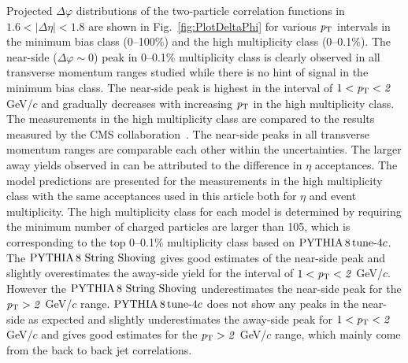 Projected $\Delta\varphi$ distributions of the two-particle correlation functions in $1.6<|\Delta\eta|<1.8$ are shown in Fig.~\ref{fig:PlotDeltaPhi} for various $\it{p}_{\rm{T}}$ intervals in the minimum bias class (0--100\%) and the high multiplicity class (0--0.1\%). The near-side ($\Delta\varphi\sim 0$) peak in 0--0.1\% multiplicity class is clearly observed in all transverse momentum ranges studied while there is no hint of signal in the minimum bias class. The near-side peak is highest in the interval of $1<\it{p}_{\rm{T}}<2$ GeV/$c$ and gradually decreases with increasing $\it{p}_{\rm{T}}$ in the high multiplicity class. The measurements in the high multiplicity class are compared to the results measured by the CMS collaboration~\cite{Khachatryan:2015lva}. The near-side peaks in all transverse momentum ranges are comparable each other within the uncertainties. The larger away yields observed in \cite{Khachatryan:2015lva} can be attributed to the difference in $\eta$ acceptances. The model predictions are presented for the measurements in the high multiplicity class with the same acceptances used in this article both for $\eta$ and event multiplicity. The high multiplicity class for each model is determined by requiring the minimum number of charged particles are larger than 105, which is corresponding to the top 0--0.1\% multiplicity class based on $\mathrm{PYTHIA}\,8\,\mathrm{tune}{\text -}4c$. The $\mathrm{PYTHIA}\,8~\mathrm{String}~\mathrm{Shoving}$ gives good estimates of the near-side peak and slightly overestimates the away-side yield for the interval of $1<\it{p}_{\rm{T}}<2$ GeV/$c$. However the $\mathrm{PYTHIA}\,8~\mathrm{String}~\mathrm{Shoving}$ underestimates the near-side peak for the $\it{p}_{\rm{T}}>2$ GeV/$c$ range. $\mathrm{PYTHIA}\,8\,\mathrm{tune}{\text -}4c$ does not show any peaks in the near-side as expected and slightly underestimates the away-side peak for $1<\it{p}_{\rm{T}}<2$ GeV/$c$ and gives good estimates for the $\it{p}_{\rm{T}}>2$ GeV/$c$ range, which mainly come from the back to back jet correlations.



